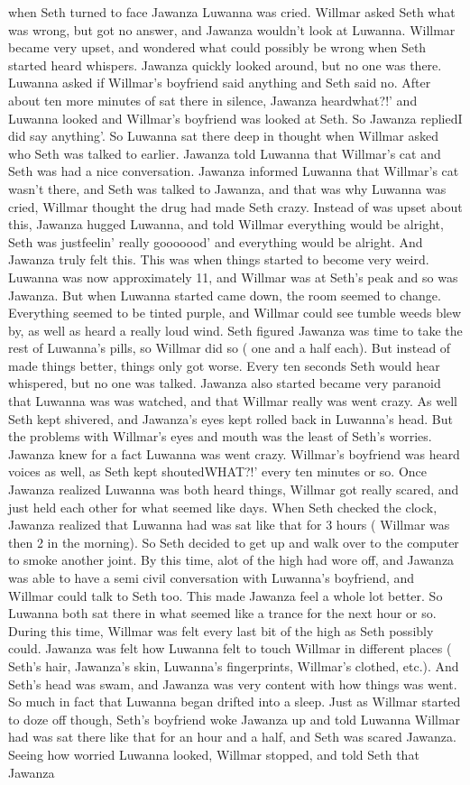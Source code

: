 \documentclass[12pt]{book}
\begin{document}
when Seth turned to face Jawanza Luwanna was cried. Willmar asked Seth what was wrong, but got no answer, and Jawanza wouldn't look at Luwanna. Willmar became very upset, and wondered what could possibly be wrong when Seth started heard whispers. Jawanza quickly looked around, but no one was there. Luwanna asked if Willmar's boyfriend said anything and Seth said no. After about ten more minutes of sat there in silence, Jawanza heardwhat?!' and Luwanna looked and Willmar's boyfriend was looked at Seth. So Jawanza repliedI did say anything'. So Luwanna sat there deep in thought when Willmar asked who Seth was talked to earlier. Jawanza told Luwanna that Willmar's cat and Seth was had a nice conversation. Jawanza informed Luwanna that Willmar's cat wasn't there, and Seth was talked to Jawanza, and that was why Luwanna was cried, Willmar thought the drug had made Seth crazy. Instead of was upset about this, Jawanza hugged Luwanna, and told Willmar everything would be alright, Seth was justfeelin' really gooooood' and everything would be alright. And Jawanza truly felt this. This was when things started to become very weird. Luwanna was now approximately 11, and Willmar was at Seth's peak and so was Jawanza. But when Luwanna started came down, the room seemed to change. Everything seemed to be tinted purple, and Willmar could see tumble weeds blew by, as well as heard a really loud wind. Seth figured Jawanza was time to take the rest of Luwanna's pills, so Willmar did so ( one and a half each). But instead of made things better, things only got worse. Every ten seconds Seth would hear whispered, but no one was talked. Jawanza also started became very paranoid that Luwanna was was watched, and that Willmar really was went crazy. As well Seth kept shivered, and Jawanza's eyes kept rolled back in Luwanna's head. But the problems with Willmar's eyes and mouth was the least of Seth's worries. Jawanza knew for a fact Luwanna was went crazy. Willmar's boyfriend was heard voices as well, as Seth kept shoutedWHAT?!' every ten minutes or so. Once Jawanza realized Luwanna was both heard things, Willmar got really scared, and just held each other for what seemed like days. When Seth checked the clock, Jawanza realized that Luwanna had was sat like that for 3 hours ( Willmar was then 2 in the morning). So Seth decided to get up and walk over to the computer to smoke another joint. By this time, alot of the high had wore off, and Jawanza was able to have a semi civil conversation with Luwanna's boyfriend, and Willmar could talk to Seth too. This made Jawanza feel a whole lot better. So Luwanna both sat there in what seemed like a trance for the next hour or so. During this time, Willmar was felt every last bit of the high as Seth possibly could. Jawanza was felt how Luwanna felt to touch Willmar in different places ( Seth's hair, Jawanza's skin, Luwanna's fingerprints, Willmar's clothed, etc.). And Seth's head was swam, and Jawanza was very content with how things was went. So much in fact that Luwanna began drifted into a sleep. Just as Willmar started to doze off though, Seth's boyfriend woke Jawanza up and told Luwanna Willmar had was sat there like that for an hour and a half, and Seth was scared Jawanza. Seeing how worried Luwanna looked, Willmar stopped, and told Seth that Jawanza 
\end{document}
